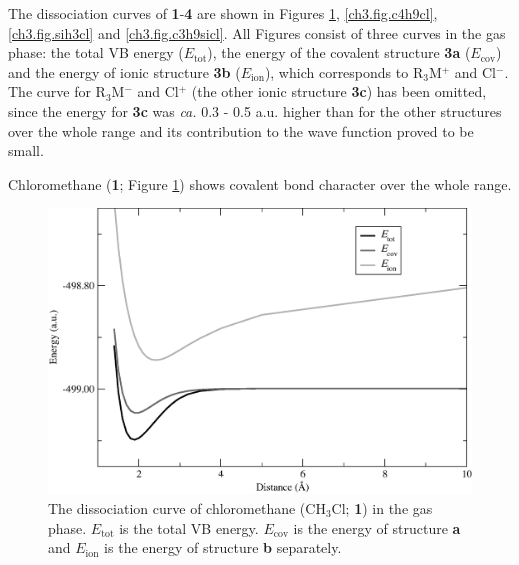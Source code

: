 The dissociation curves of \textbf{1}-\textbf{4} are shown in Figures \ref{ch3.fig.ch3cl}, \ref{ch3.fig.c4h9cl}, \ref{ch3.fig.sih3cl} and \ref{ch3.fig.c3h9sicl}. All Figures consist of three curves in the gas phase: the total VB energy ($E_\mathrm{tot}$), the energy of the covalent structure \textbf{3a} ($E_\mathrm{cov}$) and the energy of ionic structure \textbf{3b} ($E_\mathrm{ion}$), which corresponds to R$_3$M$^{+}$ and Cl$^{-}$. The curve for R$_3$M$^{-}$ and Cl$^{+}$ (the other ionic structure \textbf{3c}) has been omitted, since the energy for \textbf{3c} was \textit{ca.} 0.3 - 0.5 a.u. higher than for the other structures over the whole range and its contribution to the wave function proved to be small.

Chloromethane (\textbf{1}; Figure \ref{ch3.fig.ch3cl}) shows covalent bond character over the whole range. 
\begin{figure}[htbp]
\begin{center}
\includegraphics[scale=0.55]{dissociation/figures/ch3cl_g.eps}
\end{center}
\caption{The dissociation curve of chloromethane (CH$_3$Cl; \textbf{1}) in the gas phase. $E_\mathrm{tot}$ is the total VB energy. $E_\mathrm{cov}$ is the energy of structure \textbf{a} and $E_\mathrm{ion}$ is the energy of structure \textbf{b} separately.}
\label{ch3.fig.ch3cl}
\end{figure}
